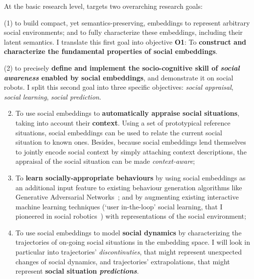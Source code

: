 
At the basic research level, \project targets two overarching research goals:

(1) to build compact, yet semantics-preserving, embeddings to represent
arbitrary social environments; and to fully characterize these embeddings,
including their latent semantics. I translate this first goal into objective
{\bf O1}: To \textbf{construct and characterize the fundamental
properties of social embeddings}.

(2) to precisely \textbf{define and implement the socio-cognitive skill of \emph{social awareness} enabled
by social embeddings}, and demonstrate it on social robots. I split this second
goal into three specific objectives: \emph{social appraisal}, \emph{social
learning}, \emph{social prediction}.



\begin{enumerate}[label=\textbf{O\arabic*}]
    \setcounter{enumi}{1}
    \item \label{T5} To use social embeddings to \textbf{automatically appraise
        social situations}, taking into account their \textbf{context}. Using
        a set of prototypical reference situations, social embeddings
        can be used to relate the current social situation to known ones.
        Besides, because social embeddings lend themselves to jointly encode
        social context by simply attaching context descriptions, the appraisal
        of the social situation can be made \emph{context-aware};

    \item \label{T4} To \textbf{learn socially-appropriate behaviours} by using
        social embeddings as an additional input feature to existing behaviour
        generation algorithms like Generative Adversarial
        Networks~\cite{marmpena2019generating,suguitan2020moveae}; and by
        augmenting existing interactive machine learning techniques (`user
        in-the-loop' social learning, that I pioneered in social
        robotics~\cite{senft2017supervised, winkle2020couch,winkle2021leador})
        with representations of the social environment;

    \item \label{T2} To use social embeddings to model \textbf{social dynamics}
        by characterizing the trajectories of on-going social situations in the
        embedding space. I will look in particular into trajectories'
        \emph{discontinuties}, that might represent unexpected changes of social
        dynamics, and trajectories' extrapolations, that might represent
        \textbf{social situation \emph{predictions}}.

\end{enumerate}

